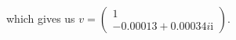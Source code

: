 \documentclass[preview]{standalone}
\begin{document}
\begin{center}
\raggedright
                which gives us \(v = \begin{pmatrix}
                                1 \\
                                -0.00013 + 0.00034i\mathrm{i}
                            \end{pmatrix}\).
\end{center}
\end{document}

